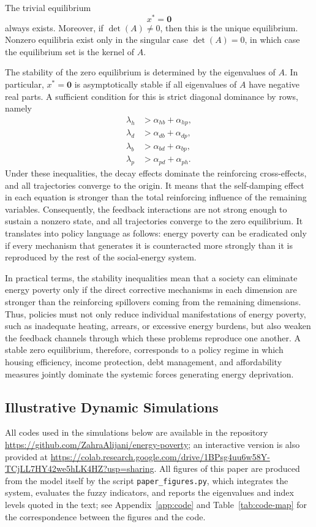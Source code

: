 \documentclass[11pt,a4paper]{article}
\newcommand{\codeurl}{https://github.com/ZahraAlijani/energy-poverty}
\begin{document}
The trivial equilibrium
\[
x^*=\mathbf{0}
\]
always exists. Moreover, if \(\det(A)\neq 0\), then this is the unique equilibrium. Nonzero equilibria exist only in the singular case \(\det(A)=0\), in which case the equilibrium set is the kernel of \(A\).

The stability of the zero equilibrium is determined by the eigenvalues of \(A\). In particular, \(x^*=\mathbf{0}\) is asymptotically stable if all eigenvalues of \(A\) have negative real parts. A sufficient condition for this is strict diagonal dominance by rows, namely
\begin{align}
\lambda_h &> \alpha_{hb}+\alpha_{hp},\\
\lambda_d &> \alpha_{db}+\alpha_{dp},\\
\lambda_b &> \alpha_{bd}+\alpha_{bp},\\
\lambda_p &> \alpha_{pd}+\alpha_{ph}.
\end{align}
Under these inequalities, the decay effects dominate the reinforcing cross-effects, and all trajectories converge to the origin. It means that the self-damping effect in each equation is stronger than the total reinforcing influence of the remaining variables. Consequently, the feedback interactions are not strong enough to sustain a nonzero state, and all trajectories converge to the zero equilibrium. It translates into policy language as follows: energy poverty can be eradicated only if every mechanism that generates it is counteracted more strongly than it is reproduced by the rest of the social-energy system.

In practical terms, the stability inequalities mean that a society can eliminate energy poverty only if the direct corrective mechanisms in each dimension are stronger than the reinforcing spillovers coming from the remaining dimensions. Thus, policies must not only reduce individual manifestations of energy poverty, such as inadequate heating, arrears, or excessive energy burdens, but also weaken the feedback channels through which these problems reproduce one another. A stable zero equilibrium, therefore, corresponds to a policy regime in which housing efficiency, income protection, debt management, and affordability measures jointly dominate the systemic forces generating energy deprivation.
\subsection{Illustrative Dynamic Simulations}\label{sec:sim}
All codes used in the simulations below are available in the repository
\url{\codeurl}; an interactive version is also provided at
\url{https://colab.research.google.com/drive/1BPsg4uu6w58Y-TCjLL7HY42we5hLK4HZ?usp=sharing}.
All figures of this paper are produced from the model itself by the script
\texttt{paper\_figures.py}, which integrates the system, evaluates the fuzzy
indicators, and reports the eigenvalues and index levels quoted in the text; see
Appendix~\ref{app:code} and Table~\ref{tab:code-map} for the correspondence
between the figures and the code.
\end{document}
